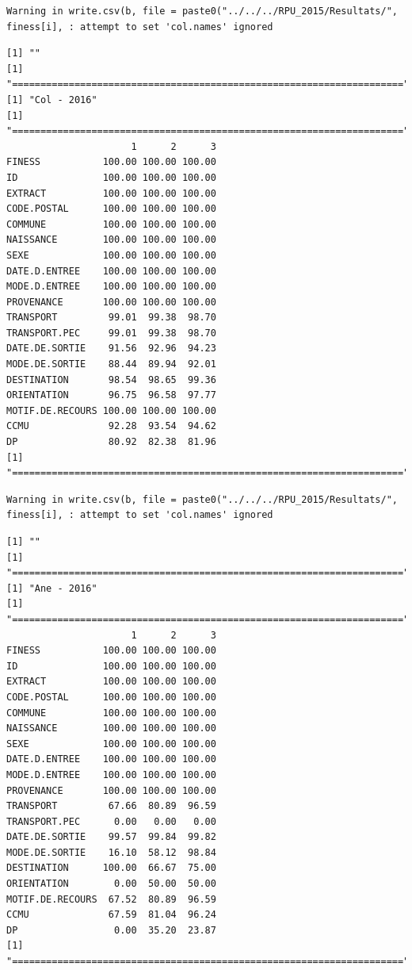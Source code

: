 \documentclass[]{article}
\begin{document}
\begin{verbatim}
Warning in write.csv(b, file = paste0("../../../RPU_2015/Resultats/",
finess[i], : attempt to set 'col.names' ignored
\end{verbatim}

\begin{verbatim}
[1] ""
[1] "====================================================================="
[1] "Col - 2016"
[1] "====================================================================="
                      1      2      3
FINESS           100.00 100.00 100.00
ID               100.00 100.00 100.00
EXTRACT          100.00 100.00 100.00
CODE.POSTAL      100.00 100.00 100.00
COMMUNE          100.00 100.00 100.00
NAISSANCE        100.00 100.00 100.00
SEXE             100.00 100.00 100.00
DATE.D.ENTREE    100.00 100.00 100.00
MODE.D.ENTREE    100.00 100.00 100.00
PROVENANCE       100.00 100.00 100.00
TRANSPORT         99.01  99.38  98.70
TRANSPORT.PEC     99.01  99.38  98.70
DATE.DE.SORTIE    91.56  92.96  94.23
MODE.DE.SORTIE    88.44  89.94  92.01
DESTINATION       98.54  98.65  99.36
ORIENTATION       96.75  96.58  97.77
MOTIF.DE.RECOURS 100.00 100.00 100.00
CCMU              92.28  93.54  94.62
DP                80.92  82.38  81.96
[1] "====================================================================="
\end{verbatim}

\begin{verbatim}
Warning in write.csv(b, file = paste0("../../../RPU_2015/Resultats/",
finess[i], : attempt to set 'col.names' ignored
\end{verbatim}

\begin{verbatim}
[1] ""
[1] "====================================================================="
[1] "Ane - 2016"
[1] "====================================================================="
                      1      2      3
FINESS           100.00 100.00 100.00
ID               100.00 100.00 100.00
EXTRACT          100.00 100.00 100.00
CODE.POSTAL      100.00 100.00 100.00
COMMUNE          100.00 100.00 100.00
NAISSANCE        100.00 100.00 100.00
SEXE             100.00 100.00 100.00
DATE.D.ENTREE    100.00 100.00 100.00
MODE.D.ENTREE    100.00 100.00 100.00
PROVENANCE       100.00 100.00 100.00
TRANSPORT         67.66  80.89  96.59
TRANSPORT.PEC      0.00   0.00   0.00
DATE.DE.SORTIE    99.57  99.84  99.82
MODE.DE.SORTIE    16.10  58.12  98.84
DESTINATION      100.00  66.67  75.00
ORIENTATION        0.00  50.00  50.00
MOTIF.DE.RECOURS  67.52  80.89  96.59
CCMU              67.59  81.04  96.24
DP                 0.00  35.20  23.87
[1] "====================================================================="
\end{verbatim}
\end{document}
